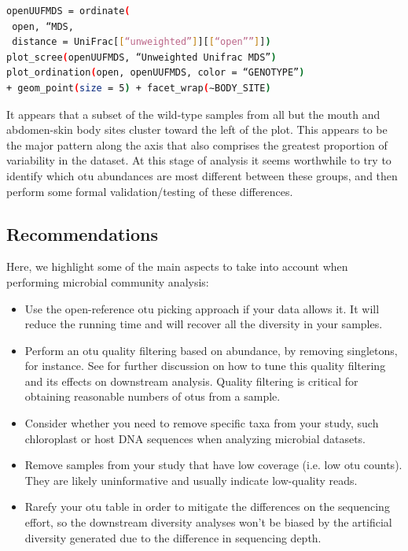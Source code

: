 \begin{lstlisting}[language=bash]
openUUFMDS = ordinate(
 open, “MDS,
 distance = UniFrac[[“unweighted”]][[“open””]])
plot_scree(openUUFMDS, “Unweighted Unifrac MDS”)
plot_ordination(open, openUUFMDS, color = “GENOTYPE”)
+ geom_point(size = 5) + facet_wrap(∼BODY_SITE)
\end{lstlisting}

It appears that a subset of the wild-type samples from all but the mouth and
abdomen-skin body sites cluster toward the left of the plot. This appears to be
the major pattern along the axis that also comprises the greatest proportion of
variability in the dataset. At this stage of analysis it seems worthwhile to try
to identify which \gls{otu} abundances are most different between these groups, and then
perform some formal validation/testing of these differences.

\subsection{Recommendations}
Here, we highlight some of the main aspects to take into account when performing microbial community analysis:

\begin{itemize}
    \item Use the open-reference \gls{otu} picking approach if your data allows it. It
    will reduce the running time and will recover all the diversity in your samples.
    \item Perform an \gls{otu} quality filtering based on abundance, by removing singletons,
    for instance. See \cite{Bokulich2013} for further discussion on how to tune this
    quality filtering and its effects on downstream analysis. Quality filtering is
    critical for obtaining reasonable numbers of \gls{otu}s from a sample.
    \item Consider whether you need to remove specific taxa from your study, such
    chloroplast or host DNA sequences when analyzing microbial datasets.
    \item Remove samples from your study that have low coverage (i.e. low \gls{otu} counts).
    They are likely uninformative and usually indicate low-quality reads.
    \item Rarefy your \gls{otu} table in order to mitigate the differences on the sequencing
    effort, so the downstream diversity analyses won’t be biased by the artificial
    diversity generated due to the difference in sequencing depth.
\end{itemize}

